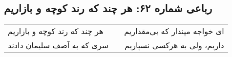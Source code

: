 \begin{center}
\section*{رباعی شماره ۶۲: هر چند که رند کوچه و بازاریم}
\label{sec:062}
\begin{longtable}{l p{0.5cm} r}
هر چند که رند کوچه و بازاریم
&&
ای خواجه مپندار که بی‌مقداریم
\\
سری که به آصف سلیمان دادند
&&
داریم، ولی به هرکسی نسپاریم
\\
\end{longtable}
\end{center}
